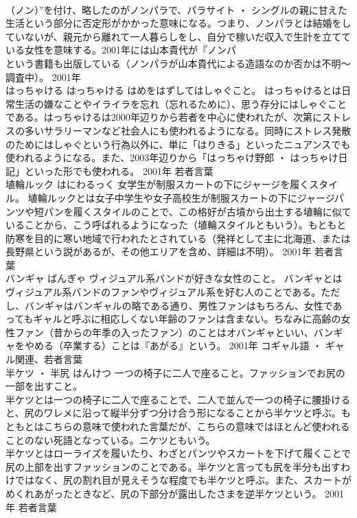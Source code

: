 \documentclass[8pt]{extreport}
\begin{document}
\begin{CJK}{UTF8}{min}
\\	（ノン）”を付け、略したのがノンパラで、パラサイト ・ シングルの親に甘えた生活という部分に否定形がかかった意味になる。つまり、ノンパラとは結婚をしていないが、親元から離れて一人暮らしをし、自分で稼いだ収入で生計を立てている女性を意味する。2001年には山本貴代が『ノンパ
\\	という書籍も出版している（ノンパラが山本貴代による造語なのか否かは不明～調査中）。	2001年	
\\	はっちゃける	はっちゃける	はめをはずしてはしゃぐこと。	はっちゃけるとは日常生活の嫌なことやイライラを忘れ（忘れるために）、思う存分にはしゃぐことである。はっちゃけるは2000年辺りから若者を中心に使われたが、次第にストレスの多いサラリーマンなど社会人にも使われるようになる。同時にストレス発散のためにはしゃぐという行為以外に、単に「はりきる」といったニュアンスでも使われるようになる。また、2003年辺りから「はっちゃけ野郎 ・ はっちゃけ日記」といった形でも使われる。	2001年	若者言葉	
\\	埴輪ルック	はにわるっく	女学生が制服スカートの下にジャージを履くスタイル。	埴輪ルックとは女子中学生や女子高校生が制服スカートの下にジャージパンツや短パンを履くスタイルのことで、この格好が古墳から出土する埴輪に似ていることから、こう呼ばれるようになった（埴輪スタイルともいう）。もともと防寒を目的に寒い地域で行われたとされている（発祥として主に北海道、または長野県という説があるが、その他エリアを含め、詳細は不明）。	2001年	若者言葉	
\\	バンギャ	ばんぎゃ	ヴィジュアル系バンドが好きな女性のこと。	バンギャとはヴィジュアル系バンドのファンやヴィジュアル系を好む人のことである。ただし、バンギャはバンギャルの略である通り、男性ファンはもちろん、女性であってもギャルと呼ぶに相応しくない年齢のファンは含まない。ちなみに高齢の女性ファン（昔からの年季の入ったファン）のことはオバンギャといい、バンギャをやめる（卒業する）ことは『あがる』という。	2001年	コギャル語 ・ ギャル関連、若者言葉	
\\	半ケツ ・ 半尻	はんけつ	一つの椅子に二人で座ること。ファッションでお尻の一部を出すこと。	
\\	半ケツとは一つの椅子に二人で座ることで、二人で並んで一つの椅子に腰掛けると、尻のワレメに沿って縦半分ずつ分け合う形になることから半ケツと呼ぶ。もともとはこちらの意味で使われた言葉だが、こちらの意味ではほとんど使われることのない死語となっている。ニケツともいう。 
\\	半ケツとはローライズを履いたり、わざとパンツやスカートを下げて履くことで尻の上部を出すファッションのことである。半ケツと言っても尻を半分も出すわけではなく、尻の割れ目が見えそうな程度でも半ケツと呼ぶ。また、スカートがめくれあがったときなど、尻の下部分が露出したさまを逆半ケツという。	2001年	若者言葉	

\end{CJK}
\end{document}
